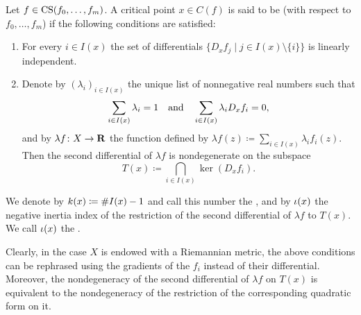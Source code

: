 \begin{definition}
\label{E!D:nondegenerate-crit-pt}
  Let $f\in \operatorname{CS}(f_0, \ldots, f_m)$. A critical point $x \in C(f)$ is said to be  (with respect to $f_0, \ldots, f_m$) if the following conditions are satisfied:
  \begin{enumerate}
  \item
    For every $i\in I(x)$ the set of differentials $\{D_x f_j \mid j \in I(x) \setminus \{i\}\}$ is linearly independent.
  \item
    Denote by $(\lambda_i)_{i\in I(x)}$ the unique list of nonnegative real numbers such that 
    \[
      \sum_{i \in I(x)} \lambda_i = 1
      \quad \textnormal{and} \quad
      \sum_{i \in I(x)} \lambda_i D_x f_i = 0,
    \]
    and by $\lambda f \colon X \to \mathbf{R}$ the function defined by $\lambda f(z) \coloneq \sum_{i \in I(x)} \lambda_i f_i(z).$ Then the second differential of $\lambda f$ is nondegenerate on the subspace
    \[
      T(x) \coloneq \bigcap_{i \in I(x)} \ker(D_x f_i).
    \]
  \end{enumerate}
  We denote by $k(x) \coloneq \#I(x) - 1$ and call this number the , and by $\iota(x)$ the negative inertia index of the restriction of the second differential of $\lambda f$ to $T(x)$. We call $\iota(x)$ the .

  Clearly, in the case $X$ is endowed with a Riemannian metric, the above conditions can be rephrased using the gradients of the $f_i$ instead of their differential. Moreover, the nondegeneracy of the second differential of $\lambda f$ on $T(x)$ is equivalent to the nondegeneracy of the restriction of the corresponding quadratic form on it.
\end{definition}

